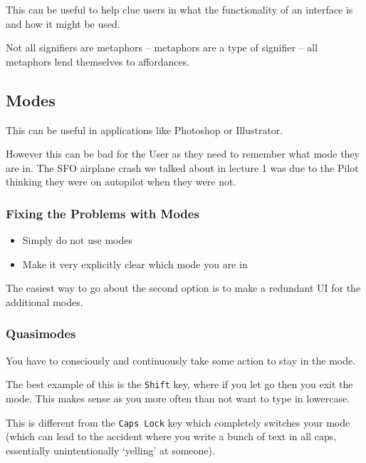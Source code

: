 This can be useful to help clue users in what the functionality of an interface is and how it might be used.

Not all signifiers are metaphors -- metaphors are a type of signifier -- all metaphors lend themselves to affordances.

\subsection{Modes}
This can be useful in applications like Photoshop or Illustrator.

However this can be bad for the User as they need to remember what mode they are in. The SFO airplane crash we talked about in lecture 1 was due to the Pilot thinking they were on autopilot when they were not.

\subsubsection{Fixing the Problems with Modes}
\begin{itemize}
    \item Simply do not use modes
    \item Make it very explicitly clear which mode you are in
\end{itemize}

The easiest way to go about the second option is to make a redundant UI for the additional modes.

\subsubsection{Quasimodes}
You have to consciously and continuously take some action to stay in the mode.

The best example of this is the \texttt{Shift} key, where if you let go then you exit the mode. This makes sense as you more often than not want to type in lowercase.

This is different from the \texttt{Caps Lock} key which completely switches your mode (which can lead to the accident where you write a bunch of text in all caps, essentially unintentionally `yelling' at someone).
